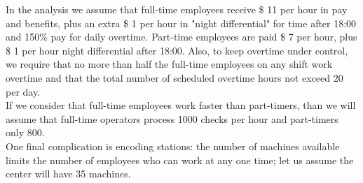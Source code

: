 \documentclass[a4paper,10 pt,titlepage,twoside]{book}
\theoremstyle{plain}
\theoremstyle{definition}
\theoremstyle{remark}
\begin{document}
In the analysis we assume that full-time employees receive \$ 11 per hour in pay and benefits, plus an extra \$ 1 per hour in "night differential" for time after 18:00 and 150\% pay for daily overtime. Part-time employees are paid \$ 7 per hour, plus \$ 1 per hour night differential after 18:00. Also, to keep overtime under control, we require that no more than half the full-time employees on any shift work overtime and that the total number of scheduled overtime hours not exceed 20 per day.\\
If we consider that full-time employees work faster than part-timers, than we will assume that full-time operators process 1000 checks per hour and part-timers only 800.\\
One final complication is encoding stations: the number of machines available limits the number of employees who can work at any one time; let us assume the center will have 35 machines.\\
\end{document}
